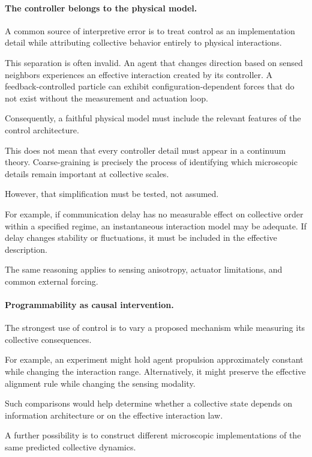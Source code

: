 \paragraph*{The controller belongs to the physical model.}

A common source of interpretive error
is to treat control as an implementation
detail while attributing collective
behavior entirely to physical interactions.

This separation is often invalid.
An agent that changes direction
based on sensed neighbors
experiences an effective
interaction created
by its controller.
A feedback-controlled
particle can exhibit
configuration-dependent
forces that do not
exist without
the measurement
and actuation loop.

Consequently,
a faithful physical
model must include
the relevant features
of the control
architecture.

This does not mean
that every controller
detail must appear
in a continuum
theory.
Coarse-graining
is precisely the
process of identifying
which microscopic
details remain
important at
collective scales.

However,
that simplification
must be tested,
not assumed.

For example,
if communication
delay has no
measurable effect
on collective
order within
a specified regime,
an instantaneous
interaction model
may be adequate.
If delay changes
stability or
fluctuations,
it must be
included in
the effective
description.

The same reasoning
applies to
sensing anisotropy,
actuator limitations,
and common
external forcing.

\paragraph*{Programmability as causal intervention.}

The strongest use of control
is to vary a proposed
mechanism while measuring
its collective consequences.

For example,
an experiment
might hold
agent propulsion
approximately
constant while
changing the
interaction range.
Alternatively,
it might preserve
the effective
alignment rule
while changing
the sensing
modality.

Such comparisons
would help determine
whether a collective
state depends
on information
architecture
or on the
effective
interaction law.

A further
possibility
is to construct
different microscopic
implementations
of the same
predicted collective
dynamics.

